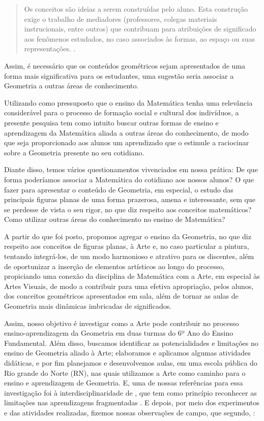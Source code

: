 \begin{refsection}
    \begin{quotation}
        Os conceitos são ideias a serem construídas pelo aluno. Esta construção exige o trabalho de mediadores (professores, colegas materiais instrucionais, entre outros) que contribuam para atribuições de significado aos fenômenos estudados, no caso associados às formas, ao espaço ou suas representações. \cite[p.~7]{RÊGOAndRÊGOAndKLEBER2012Laboratório}.
    \end{quotation}

    Assim, é necessário que os conteúdos geométricos sejam apresentados de uma forma mais significativa para os estudantes, uma sugestão seria associar a Geometria a outras áreas de conhecimento. 

    Utilizando como pressuposto que o ensino da Matemática tenha uma relevância considerável para o processo de formação social e cultural dos indivíduos, a presente pesquisa tem como intuito buscar outras formas de ensino e aprendizagem da Matemática aliada a outras áreas do conhecimento, de modo que seja proporcionado aos alunos um aprendizado que o estimule a raciocinar sobre a Geometria presente no seu cotidiano.  

    Diante disso, temos vários questionamentos vivenciados em nossa prática: De que forma poderíamos associar a Matemática do cotidiano aos nossos alunos? O que fazer para apresentar o conteúdo de Geometria, em especial, o estudo das principais figuras planas de uma forma prazerosa, amena e interessante, sem que se perdesse de vista o seu rigor, no que diz respeito aos conceitos matemáticos? Como utilizar outras áreas do conhecimento no ensino de Matemática? 

    A partir do que foi posto, propomos agregar o ensino da Geometria, no que diz respeito aos conceitos de figuras planas, à Arte e, no caso particular a pintura, tentando integrá-los, de um modo harmonioso e atrativo para os discentes, além de oportunizar a inserção de elementos artísticos ao longo do processo, propiciando uma conexão da disciplina de Matemática com a Arte, em especial às Artes Visuais, de modo a contribuir para uma efetiva apropriação, pelos alunos, dos conceitos geométricos apresentados em sala, além de tornar as aulas de Geometria mais dinâmicas imbricadas de significados. 

    Assim, nosso objetivo é investigar como a Arte pode contribuir no processo ensino-aprendizagem da Geometria em duas turmas do 6º Ano do Ensino Fundamental. Além disso, buscamos identificar as potencialidades e limitações no ensino de Geometria aliado à Arte; elaboramos e aplicamos algumas atividades didáticas, e por fim planejamos e desenvolvemos aulas, em uma escola pública do Rio grande do Norte (RN), nas quais utilizamos a Arte como caminho para o ensino e aprendizagem de Geometria. E, uma de nossas referências para essa investigação foi à interdisciplinaridade de \textcite{FAZENDA2011Integração}, que tem como princípio reconhecer as limitações nas aprendizagens fragmentadas \cite{FAZENDA2011Integração}. E depois, por meio dos experimentos e das atividades realizadas, fizemos nossas observações de campo, que segundo, \textcite{LAVILLEAndDIONES1999Construção}:  


\end{refsection}
